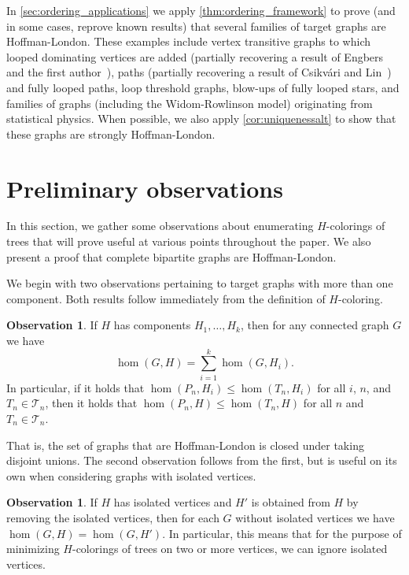\documentclass[11pt]{article}
\theoremstyle{definition}
\newtheorem{observation}[theorem]{Observation}
\begin{document}
In \cref{sec:ordering_applications} we apply \cref{thm:ordering_framework} to prove (and in some cases, reprove known results) that several families of target graphs are Hoffman-London. These examples include vertex transitive graphs to which looped dominating vertices are added (partially recovering a result of Engbers and the first author~\cite{EngbersGalvin2017}), paths (partially recovering a result of Csikv\'ari and Lin~\cite{CsikvariLin2015}) and fully looped paths, loop threshold graphs, blow-ups of fully looped stars, and families of graphs (including the Widom-Rowlinson model) originating from statistical physics. When possible, we also apply \cref{cor:uniquenessalt} to show that these graphs are strongly Hoffman-London.

\section{Preliminary observations} \label{sec:prelim_obsv}

In this section, we gather some observations about enumerating $H$-colorings of trees that will prove useful at various points throughout the paper. We also present a proof that complete bipartite graphs are Hoffman-London. 

We begin with two observations pertaining to target graphs with more than one component. Both results follow immediately from the definition of $H$-coloring.

\begin{observation} \label{obs:union_of_comp}
If $H$ has components $H_1, \ldots, H_k$, then for any connected graph $G$ we have
\[\hom(G,H) = \sum_{i=1}^k \hom(G,H_i).\]
In particular, if it holds that $\hom(P_n,H_i) \le \hom(T_n,H_i)$ for all $i$, $n$, and $T_n \in {\mathcal T}_n$, then it holds that $\hom(P_n,H) \le \hom(T_n,H)$ for all $n$ and $T_n \in {\mathcal T}_n$.
\end{observation}

That is, the set of graphs that are Hoffman-London is closed under taking disjoint unions. The second observation follows from the first, but is useful on its own when considering graphs with isolated vertices.

\begin{observation} \label{obs:isolated}
If $H$ has isolated vertices and $H'$ is obtained from $H$ by removing the isolated vertices, then for each $G$ without isolated vertices we have $\hom(G,H)=\hom(G,H')$. In particular, this means that for the purpose of minimizing $H$-colorings of trees on two or more vertices, we can ignore isolated vertices. 
\end{observation}
\end{document}
